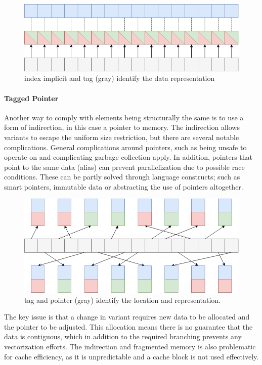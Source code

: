 \documentclass{article}
\begin{document}
\begin{figure}[ht]
    \centering
    \includegraphics[scale=0.4]{taggedunion}
    \caption{ index implicit and tag (gray) identify the data representation }
\end{figure}

\newpage

\paragraph{Tagged Pointer}

Another way to comply with elements being structurally the same is to use a form of indirection, in this case a pointer to memory.
The indirection allows variants to escape the uniform size restriction, but there are several notable complications.
General complications around pointers, such as being unsafe to operate on and complicating garbage collection apply.
In addition, pointers that point to the same data (alias) can prevent parallelization due to possible race conditions.
These can be partly solved through language constructs; such as smart pointers, immutable data or abstracting the use of pointers altogether.

\begin{figure}[ht]
    \centering
    \includegraphics[scale=0.4]{taggedpointer}
    \caption{ tag and pointer (gray) identify the location and representation. }
\end{figure}

The key issue is that a change in variant requires new data to be allocated and the pointer to be adjusted.
This allocation means there is no guarantee that the data is contiguous, which in addition to the required branching prevents any vectorization efforts.
The indirection and fragmented memory is also problematic for cache efficiency, as it is unpredictable and a cache block is not used effectively.
\end{document}
